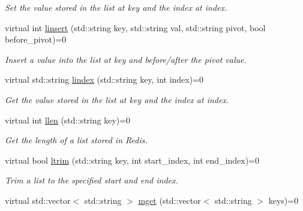 \begin{DoxyCompactItemize}
\begin{DoxyCompactList}\small\item\em Set the value stored in the list at key and the index at index. \end{DoxyCompactList}\item 
\hypertarget{classRedisInterface_a3ad704dc93fb00508f55b1e1eb48befa}{virtual int \hyperlink{classRedisInterface_a3ad704dc93fb00508f55b1e1eb48befa}{linsert} (std\-::string key, std\-::string val, std\-::string pivot, bool before\-\_\-pivot)=0}\label{classRedisInterface_a3ad704dc93fb00508f55b1e1eb48befa}

\begin{DoxyCompactList}\small\item\em Insert a value into the list at key and before/after the pivot value. \end{DoxyCompactList}\item 
\hypertarget{classRedisInterface_a0d5c84fe82cb6b83e37fe1e16941c87f}{virtual std\-::string \hyperlink{classRedisInterface_a0d5c84fe82cb6b83e37fe1e16941c87f}{lindex} (std\-::string key, int index)=0}\label{classRedisInterface_a0d5c84fe82cb6b83e37fe1e16941c87f}

\begin{DoxyCompactList}\small\item\em Get the value stored in the list at key and the index at index. \end{DoxyCompactList}\item 
\hypertarget{classRedisInterface_a67309af9d56fc0e8f413897bd5ec2a1f}{virtual int \hyperlink{classRedisInterface_a67309af9d56fc0e8f413897bd5ec2a1f}{llen} (std\-::string key)=0}\label{classRedisInterface_a67309af9d56fc0e8f413897bd5ec2a1f}

\begin{DoxyCompactList}\small\item\em Get the length of a list stored in Redis. \end{DoxyCompactList}\item 
\hypertarget{classRedisInterface_a65c6e61527d2947eb6055b61eece2f88}{virtual bool \hyperlink{classRedisInterface_a65c6e61527d2947eb6055b61eece2f88}{ltrim} (std\-::string key, int start\-\_\-index, int end\-\_\-index)=0}\label{classRedisInterface_a65c6e61527d2947eb6055b61eece2f88}

\begin{DoxyCompactList}\small\item\em Trim a list to the specified start and end index. \end{DoxyCompactList}\item 
\hypertarget{classRedisInterface_a38b721e7e8036bfba391b9ddec1725b5}{virtual std\-::vector$<$ std\-::string $>$ \hyperlink{classRedisInterface_a38b721e7e8036bfba391b9ddec1725b5}{mget} (std\-::vector$<$ std\-::string $>$ keys)=0}\label{classRedisInterface_a38b721e7e8036bfba391b9ddec1725b5}


\end{DoxyCompactItemize}
